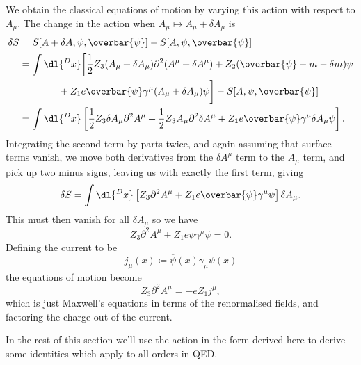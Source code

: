 \documentclass[fleqn]{NotesClass}
\newcommand{\diracadjoint}[1]{\overbar{#1}}
\newcommand{\dalembertian}{\partial^2}
\begin{document}
    We obtain the classical equations of motion by varying this action with respect to \(A_\mu\).
    The change in the action when \(A_\mu \mapsto A_\mu + \delta A_\mu\) is
    \begin{align}
        \delta S &= S[A + \delta A, \psi, \diracadjoint{\psi}] - S[A, \psi, \diracadjoint{\psi}]\\
         &= \int \dl{^D x} \bigg[ \frac{1}{2}Z_3 (A_\mu + \delta A_\mu)\dalembertian(A^\mu + \delta A^\mu) + Z_2(\diracadjoint{\psi} - m - \delta m)\psi \notag\\
         &\qquad\qquad + Z_1e\diracadjoint{\psi}\gamma^\mu(A_\mu + \delta A_\mu)\psi \bigg] - S[A, \psi, \diracadjoint{\psi}]\\
         &= \int \dl{^Dx} \left[ \frac{1}{2}Z_3 \delta A_\mu \dalembertian A^\mu + \frac{1}{2}Z_3 A_\mu \dalembertian \delta A^\mu + Z_1 e\diracadjoint{\psi}\gamma^\mu \delta A_\mu \psi \right].
    \end{align}
    Integrating the second term by parts twice, and again assuming that surface terms vanish, we move both derivatives from the \(\delta A^\mu\) term to the \(A_\mu\) term, and pick up two minus signs, leaving us with exactly the first term, giving
    \begin{equation}
        \delta S = \int \dl{^Dx}\left[ Z_3 \dalembertian A^\mu + Z_1e\diracadjoint{\psi}\gamma^\mu \psi \right] \delta A_\mu.
    \end{equation}
    This must then vanish for all \(\delta A_\mu\) so we have
    \begin{equation}
        Z_3 \dalembertian A^\mu + Z_1 e\diracadjoint{\psi} \gamma^\mu \psi = 0.
    \end{equation}
    Defining the current to be
    \begin{equation}
        j_\mu(x) \coloneqq \diracadjoint{\psi}(x) \gamma_\mu \psi(x)
    \end{equation}
    the equations of motion become
    \begin{equation}
        Z_3 \dalembertian A^\mu = -eZ_1 j^\mu,
    \end{equation}
    which is just Maxwell's equations in terms of the renormalised fields, and factoring the charge out of the current.
    
    In the rest of this section we'll use the action in the form derived here to derive some identities which apply to all orders in QED.
    
\end{document}
